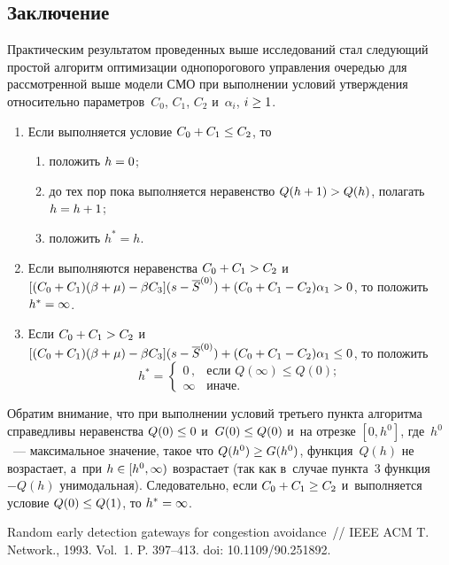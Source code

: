 \begin{multicols}{2}
\section{Заключение}

  Практическим результатом проведенных выше исследований стал 
сле\-ду\-ющий прос\-той алгоритм оптимизации однопорогового управ\-ле\-ния 
оче\-редью для рассмотренной выше модели СМО при выполнении условий 
утверж\-де\-ния относительно па\-ра\-мет\-ров~$C_0$, $C_1$, $C_2$ и~$\alpha_i$, 
$i\hm\geq 1$.
  \begin{enumerate}[1.]
\item Если выполняется условие $C_0\hm+ C_1\hm\leq C_2$, то
\begin{enumerate}[(1)]
\item  положить $h\hm=0$;
\item  до тех пор пока выполняется неравенство $Q(h+1)\hm> Q(h)$, полагать 
$h\hm= h+1$;
\item  положить $h^*=h$.
\end{enumerate}
\item Если выполняются неравенства $C_0\hm+C_1\hm >C_2$ и~$[(C_0\hm+ 
C_1)(\beta\hm+ \mu) \hm- \beta C_3] (s\hm- \overline{S}^{(0)} ) \hm+ (C_0\hm+ 
C_1\hm- C_2)\alpha_1\hm>0$, то положить $h^*\hm= \infty$. 
\item Если $C_0\hm+C_1\hm> C_2$ и~$[(C_0\hm+ C_1)(\beta\hm+ \mu) \hm- \beta 
C_3] (s\hm- \overline{S}^{(0)} ) \hm+ (C_0\hm+ C_1\hm- C_2)\alpha_1\hm\leq 0$, то 
положить 
$$
h^*= \begin{cases}
0\,, &\mbox{если\ } Q(\infty)\leq Q(0);\\
\infty &\mbox{иначе.}
\end{cases}
$$
\end{enumerate}
  
  Обратим внимание, что при выполнении условий третьего пункта алгоритма 
справедливы неравенства $Q(0)\hm\leq 0$ и~$G(0)\hm\leq Q(0)$ и~на отрезке 
$[0,h^0]$, где~$h^0$~--- максимальное значение, такое что $Q(h^0)\hm\geq 
G(h^0)$, функция~$Q(h)$ не возрастает, а~при $h\hm\in [h^0,\infty)$ возрастает 
(так как в~случае пункта~3 функция $-Q(h)$ унимодальная). Следовательно, если 
$C_0\hm+C_1\hm\geq C_2$ и~выполняется условие $Q(0)\hm\leq Q(1)$, то 
$h^*\hm=\infty$.

{\small\frenchspacing
 {\baselineskip=11.5pt
 \begin{thebibliography}{99}
 Random early detection gateways for congestion avoidance~// 
IEEE ACM T. Network., 1993. Vol.~1. P. 397--413. doi: 10.1109/90.251892.


\end{thebibliography}}}
\end{multicols}
